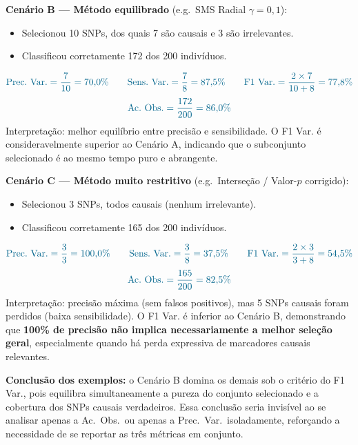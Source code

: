 \documentclass[
    12pt,
    a4paper,
    oneside,
    english,
    french,
    spanish,
    brazil
    ]{abntex2}
\newcommand{\novo}[1]{\textcolor{corNova}{#1}}
\begin{document}
\medskip
\noindent\novo{\textbf{Cenário B --- Método equilibrado} (e.g.\ SMS Radial $\gamma = 0{,}1$):}
\begin{itemize}
  \item \novo{Selecionou 10 SNPs, dos quais 7 são causais e 3 são irrelevantes.}
  \item \novo{Classificou corretamente 172 dos 200 indivíduos.}
\end{itemize}
\begin{equation}
  \novo{\text{Prec.\ Var.} = \frac{7}{10} = 70{,}0\% \qquad
   \text{Sens.\ Var.} = \frac{7}{8} = 87{,}5\% \qquad
   \text{F1\ Var.} = \frac{2\times7}{10+8} = 77{,}8\%}
  \label{eq:metricas-b}
\end{equation}
\begin{equation}
  \novo{\text{Ac.\ Obs.} = \frac{172}{200} = 86{,}0\%}
  \label{eq:acobs-b}
\end{equation}
\novo{Interpretação: melhor equilíbrio entre precisão e sensibilidade. O F1 Var. é consideravelmente superior ao Cenário A, indicando que o subconjunto selecionado é ao mesmo tempo puro e abrangente.}

\medskip
\noindent\novo{\textbf{Cenário C --- Método muito restritivo} (e.g.\ Interseção / Valor-$p$ corrigido):}
\begin{itemize}
  \item \novo{Selecionou 3 SNPs, todos causais (nenhum irrelevante).}
  \item \novo{Classificou corretamente 165 dos 200 indivíduos.}
\end{itemize}
\begin{equation}
  \novo{\text{Prec.\ Var.} = \frac{3}{3} = 100{,}0\% \qquad
   \text{Sens.\ Var.} = \frac{3}{8} = 37{,}5\% \qquad
   \text{F1\ Var.} = \frac{2\times3}{3+8} = 54{,}5\%}
  \label{eq:metricas-c}
\end{equation}
\begin{equation}
  \novo{\text{Ac.\ Obs.} = \frac{165}{200} = 82{,}5\%}
  \label{eq:acobs-c}
\end{equation}
\novo{Interpretação: precisão máxima (sem falsos positivos), mas 5 SNPs causais foram perdidos (baixa sensibilidade). O F1 Var. é inferior ao Cenário B, demonstrando que \textbf{100\% de precisão não implica necessariamente a melhor seleção geral}, especialmente quando há perda expressiva de marcadores causais relevantes.}

\medskip
\novo{\textbf{Conclusão dos exemplos:} o Cenário B domina os demais sob o critério do F1 Var., pois equilibra simultaneamente a pureza do conjunto selecionado e a cobertura dos SNPs causais verdadeiros. Essa conclusão seria invisível ao se analisar apenas a Ac.\ Obs.\ ou apenas a Prec.\ Var.\ isoladamente, reforçando a necessidade de se reportar as três métricas em conjunto.}
\end{document}
